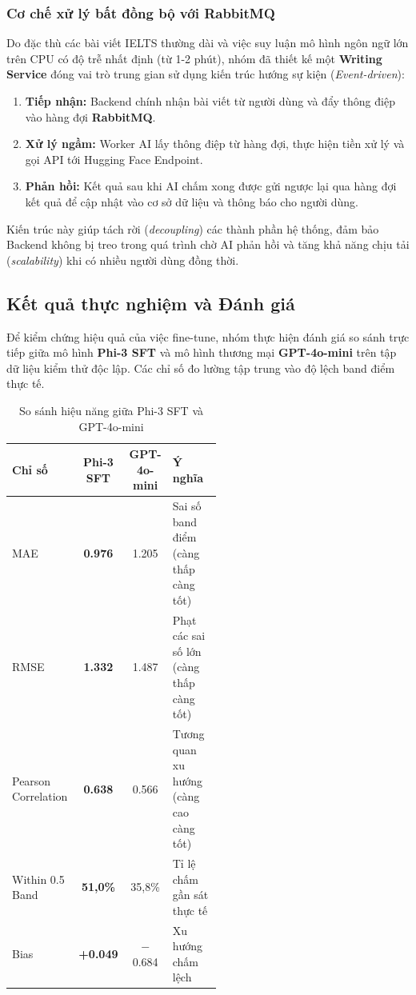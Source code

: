 \subsubsection{Cơ chế xử lý bất đồng bộ với RabbitMQ}
Do đặc thù các bài viết IELTS thường dài và việc suy luận mô hình ngôn ngữ lớn trên CPU có độ trễ nhất định (từ 1-2 phút), nhóm đã thiết kế một \textbf{Writing Service} đóng vai trò trung gian sử dụng kiến trúc hướng sự kiện (\textit{Event-driven}):
\begin{enumerate}
    \item \textbf{Tiếp nhận:} Backend chính nhận bài viết từ người dùng và đẩy thông điệp vào hàng đợi \textbf{RabbitMQ}.
    \item \textbf{Xử lý ngầm:} Worker AI lấy thông điệp từ hàng đợi, thực hiện tiền xử lý và gọi API tới Hugging Face Endpoint.
    \item \textbf{Phản hồi:} Kết quả sau khi AI chấm xong được gửi ngược lại qua hàng đợi kết quả để cập nhật vào cơ sở dữ liệu và thông báo cho người dùng.
\end{enumerate}
Kiến trúc này giúp tách rời (\textit{decoupling}) các thành phần hệ thống, đảm bảo Backend không bị treo trong quá trình chờ AI phản hồi và tăng khả năng chịu tải (\textit{scalability}) khi có nhiều người dùng đồng thời.

\subsection{Kết quả thực nghiệm và Đánh giá}
Để kiểm chứng hiệu quả của việc fine-tune, nhóm thực hiện đánh giá so sánh trực tiếp giữa mô hình \textbf{Phi-3 SFT} và mô hình thương mại \textbf{GPT-4o-mini} trên tập dữ liệu kiểm thử độc lập. Các chỉ số đo lường tập trung vào độ lệch band điểm thực tế.

\begin{table}[H]
\centering
\caption{So sánh hiệu năng giữa Phi-3 SFT và GPT-4o-mini}
\renewcommand{\arraystretch}{1.4}
\small
\begin{tabular}{|p{0.22\linewidth}|c|c|p{0.3\linewidth}|}
\hline
\textbf{Chỉ số} & \textbf{Phi-3 SFT} & \textbf{GPT-4o-mini} & \textbf{Ý nghĩa} \\ \hline
MAE & \textbf{0.976} & 1.205 & Sai số band điểm (càng thấp càng tốt) \\ \hline
RMSE & \textbf{1.332} & 1.487 & Phạt các sai số lớn (càng thấp càng tốt) \\ \hline
Pearson Correlation & \textbf{0.638} & 0.566 & Tương quan xu hướng (càng cao càng tốt) \\ \hline
Within 0.5 Band & \textbf{51,0\%} & 35,8\% & Tỉ lệ chấm gần sát thực tế \\ \hline
Bias & \textbf{+0.049} & $-$0.684 & Xu hướng chấm lệch \\ \hline
\end{tabular}
\end{table}


